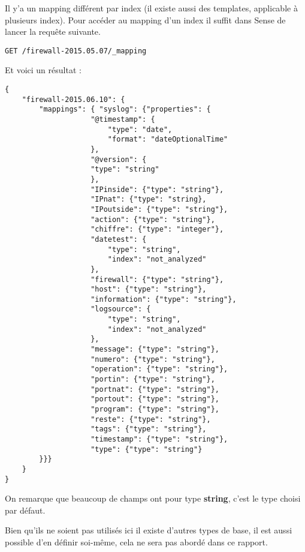Il y'a un mapping différent par index (il existe aussi des templates, applicable 
à plusieurs index). Pour accéder au mapping d'un index il suffit dans Sense de lancer
la requête suivante.

\begin{lstlisting}[style=code,label={lst:mappingget1},caption={Obtenir un mapping}]
GET /firewall-2015.05.07/_mapping
\end{lstlisting}

Et voici un résultat :

\begin{lstlisting}[style=code,label={lst:mappingresult},caption={Exemple de mapping}]
{
    "firewall-2015.06.10": {
        "mappings": { "syslog": {"properties": {
                    "@timestamp": {
                        "type": "date",
                        "format": "dateOptionalTime"
                    },
                    "@version": {
                    "type": "string"
                    },
                    "IPinside": {"type": "string"},
                    "IPnat": {"type": "string},
                    "IPoutside": {"type": "string"},
                    "action": {"type": "string"},
                    "chiffre": {"type": "integer"},
                    "datetest": {
                        "type": "string",
                        "index": "not_analyzed"
                    },
                    "firewall": {"type": "string"},
                    "host": {"type": "string"},
                    "information": {"type": "string"},
                    "logsource": {
                        "type": "string",
                        "index": "not_analyzed"
                    },
                    "message": {"type": "string"},
                    "numero": {"type": "string"},
                    "operation": {"type": "string"},
                    "portin": {"type": "string"},
                    "portnat": {"type": "string"},
                    "portout": {"type": "string"},
                    "program": {"type": "string"},
                    "reste": {"type": "string"},
                    "tags": {"type": "string"},
                    "timestamp": {"type": "string"},
                    "type": {"type": "string"}
        }}}
    }
}
\end{lstlisting}


On remarque que beaucoup de champs ont pour type \textbf{string}, c'est le type choisi
par défaut.

Bien qu'ils ne soient pas utilisés ici il existe d'autres types de base, il est aussi
possible d'en définir soi-même, cela ne sera pas abordé dans ce rapport.

